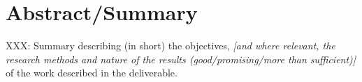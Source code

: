 \chapter{Abstract/Summary}
\label{sec:abstract}

XXX: Summary describing (in short) the objectives, \emph{[and where relevant, the
  research methods and nature of the results (good/promising/more than
  sufficient)]} of the work described in the deliverable.

\clearpage

